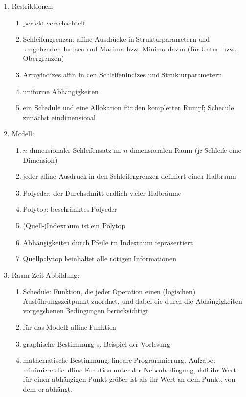 \begin{enumerate}
\item Restriktionen:
\begin{enumerate}
\item perfekt verschachtelt
\item Schleifengrenzen: affine Ausdrücke in Strukturparametern und umgebenden
  Indizes und Maxima bzw. Minima davon (für Unter- bzw. Obergrenzen)
\item Arrayindizes affin in den Schleifenindizes und Strukturparametern
\item uniforme Abhängigkeiten
\item ein Schedule und eine Allokation für den kompletten Rumpf;
  Schedule zunächst eindimensional
\end{enumerate}
%
\item Modell:
\begin{enumerate}
\item $n$-dimensionaler Schleifensatz im $n$-dimensionalen Raum (je
  Schleife eine Dimension)
\item jeder affine Ausdruck in den Schleifengrenzen definiert einen
  Halbraum
\item Polyeder: der Durchschnitt endlich vieler Halbräume
\item Polytop: beschränktes Polyeder 
\item (Quell-)Indexraum ist ein Polytop
\item Abhängigkeiten durch Pfeile im Indexraum repräsentiert
\item Quellpolytop beinhaltet alle nötigen Informationen
\end{enumerate}
%
\item Raum-Zeit-Abbildung:
\begin{enumerate}
\item Schedule: Funktion, die jeder Operation einen (logischen)
  Ausführungszeitpunkt zuordnet, und dabei die durch die Abhängigkeiten
  vorgegebenen Bedingungen berücksichtigt
\item für das Modell: affine Funktion
\item graphische Bestimmung s. Beispiel der Vorlesung
\item mathematische Bestimmung: lineare Programmierung. Aufgabe:
  minimiere die affine Funktion unter der Nebenbedingung, daß ihr Wert
  für einen abhängigen Punkt größer ist als ihr Wert an dem Punkt, von
  dem er abhängt.

\end{enumerate}
\end{enumerate}

